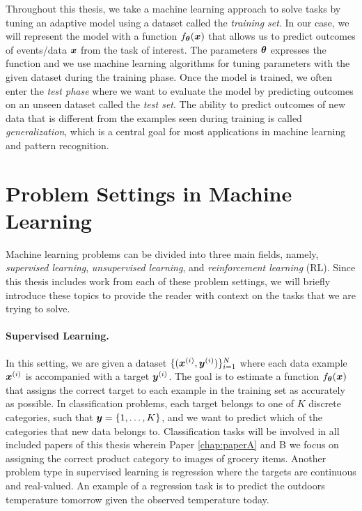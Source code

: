 
Throughout this thesis, we take a machine learning approach to solve tasks by tuning an adaptive model using a dataset called the \textit{training set}. In our case, we will represent the model with a function $f_{{\bm{\theta}}}({\bm{x}})$ that allows us to predict outcomes of events/data ${\bm{x}}$ from the task of interest. The parameters ${\bm{\theta}}$ expresses the function and we use machine learning algorithms for tuning parameters with the given dataset during the training phase. Once the model is trained, we often enter the \textit{test phase} where we want to evaluate the model by predicting outcomes on an unseen dataset called the \textit{test set}. The ability to predict outcomes of new data that is different from the examples seen during training is called \textit{generalization}, which is a central goal for most applications in machine learning and pattern recognition. 


\section{Problem Settings in Machine Learning}

Machine learning problems can be divided into three main fields, namely, \textit{supervised learning}, \textit{unsupervised learning}, and \textit{reinforcement learning} (RL). Since this thesis includes work from each of these problem settings, we will briefly introduce these topics to provide the reader with context on the tasks that we are trying to solve. 

\paragraph{Supervised Learning.} In this setting, we are given a dataset $\{({\bm{x}}^{(i)}, {\bm{y}}^{(i)})\}_{i=1}^{N}$ where each data example ${\bm{x}}^{(i)}$ is accompanied with a target ${\bm{y}}^{(i)}$. The goal is to estimate a function $f_{{\bm{\theta}}}({\bm{x}})$ that assigns the correct target to each example in the training set as accurately as possible. In classification problems, each target belongs to one of $K$ discrete categories, such that ${\bm{y}} = \{1, \dots, K\}$, and we want to predict which of the categories that new data belongs to. Classification tasks will be involved in all included papers of this thesis wherein Paper \ref{chap:paperA} and B we focus on assigning the correct product category to images of grocery items. Another problem type in supervised learning is regression where the targets are continuous and real-valued. An example of a regression task is to predict the outdoors temperature tomorrow given the observed temperature today. 


